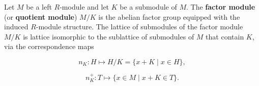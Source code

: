 Let $M$ be a left $R$-module and let $K$ be a submodule of $M$. The \textbf{factor module} (or \textbf{quotient module}) $M/K$ is the abelian factor group equipped with the induced $R$-module structure. The lattice of submodules of the factor module $M/K$ is lattice isomorphic to the sublattice of submodules of $M$ that contain $K$, via the correspondence maps

$$n_K: H \mapsto H/K = \{x + K \mid x \in H\},$$

$$n_K^+: T \mapsto \{x \in M \mid x + K \in T\}.$$

